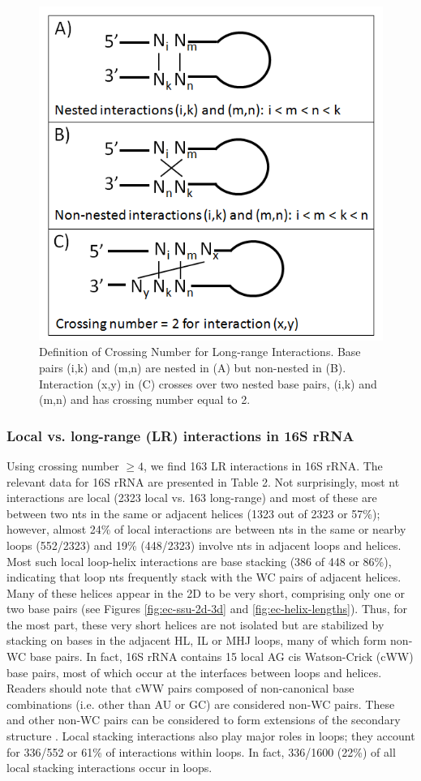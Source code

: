 \begin{figure}
  \includegraphics[width=0.5\linewidth]{chapter-1/figs/nested}
  \caption{Definition of Crossing Number for Long-range Interactions. Base pairs
    (i,k) and (m,n) are nested in (A) but non-nested in (B). Interaction (x,y)
    in (C) crosses over two nested base pairs, (i,k) and (m,n) and has crossing
  number equal to 2.}
  \label{fig:nesting}
\end{figure}

\subsubsection{Local vs. long-range (LR) interactions in 16S rRNA}

Using crossing number $\ge 4$, we find 163 LR interactions in 16S rRNA. The
relevant data for \EC{} 16S rRNA are presented in Table 2. Not surprisingly,
most nt interactions are local (2323 local vs. 163 long-range) and most of these
are between two nts in the same or adjacent helices (1323 out of 2323 or 57\%);
however, almost 24\% of local interactions are between nts in the same or nearby
loops (552/2323) and 19\% (448/2323) involve nts in adjacent loops and helices.
Most such local loop-helix interactions are base stacking (386 of 448 or 86\%),
indicating that loop nts frequently stack with the WC pairs of adjacent helices.
Many of these helices appear in the 2D to be very short, comprising only one or
two base pairs (see Figures \ref{fig:ec-ssu-2d-3d} and
\ref{fig:ec-helix-lengths}). Thus, for the most part, these very short helices
are not isolated but are stabilized by stacking on bases in the adjacent HL, IL
or MHJ loops, many of which form non-WC base pairs. In fact, 16S rRNA contains
15 local AG cis Watson-Crick (cWW) base pairs, most of which occur at the
interfaces between loops and helices. Readers should note that cWW pairs
composed of non-canonical base combinations (i.e. other than AU or GC) are
considered non-WC pairs. These and other non-WC pairs can be considered to
form extensions of the secondary structure \cite{Gutell1990}. Local stacking
interactions also play major roles in loops; they account for 336/552 or 61\%
of interactions within loops. In fact, 336/1600 (22\%) of all local stacking
interactions occur in loops. 

